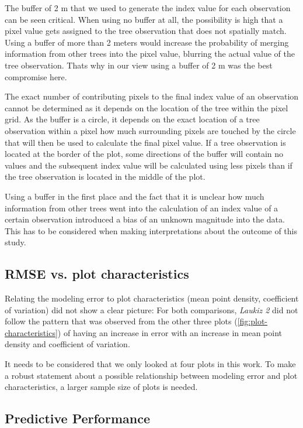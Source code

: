 \documentclass[review]{elsarticle}
\begin{document}
\noindent The buffer of 2 m that we used to generate the index value for each observation can be seen critical.
When using no buffer at all, the possibility is high that a pixel value gets assigned to the tree observation that does not spatially match.
Using a buffer of more than 2 meters would increase the probability of merging information from other trees into the pixel value, blurring the actual value of the tree observation.
Thats why in our view using a buffer of 2 m was the best compromise here.

The exact number of contributing pixels to the final index value of an observation cannot be determined as it depends on the location of the tree within the pixel grid.
As the buffer is a circle, it depends on the exact location of a tree observation within a pixel how much surrounding pixels are touched by the circle that will then be used to calculate the final pixel value.
If a tree observation is located at the border of the plot, some directions of the buffer will contain no values and the subsequent index value will be calculated using less pixels than if the tree observation is located in the middle of the plot.

Using a buffer in the first place and the fact that it is unclear how much information from other trees went into the calculation of an index value of a certain observation introduced a bias of an unknown magnitude into the data.
This has to be considered when making interpretations about the outcome of this study.

\subsection{RMSE vs. plot characteristics}

\noindent Relating the modeling error to plot characteristics (mean point density, coefficient of variation) did not show a clear picture: For both comparisons, \textit{Laukiz 2} did not follow the pattern that was observed from the other three plots (\autoref{fig:plot-characteristics}) of having an increase in error with an increase in mean point density and coefficient of variation.

It needs to be considered that we only looked at four plots in this work.
To make a robust statement about a possible relationship between modeling error and plot characteristics, a larger sample size of plots is needed.

\subsection{Predictive Performance}
\end{document}
